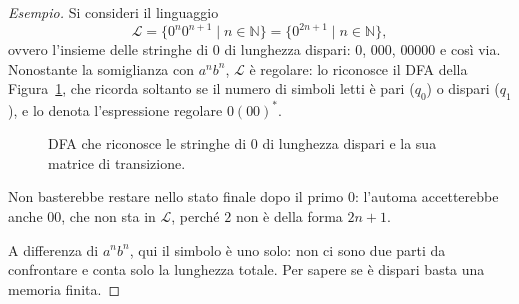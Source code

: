 \documentclass[a4paper, 11pt, oneside]{book}
\theoremstyle{formale}
\newenvironment{esempio}
    {\begin{proof}[\textit{Esempio}]\renewcommand{\qedsymbol}{$\diamond$}}
    {\end{proof}}
\begin{document}
    \begin{esempio}
        Si consideri il linguaggio
        \begin{equation*}
            \mathcal{L} = \{0^n 0^{n+1} \mid n \in \mathbb{N}\}
            = \{0^{2n+1} \mid n \in \mathbb{N}\},
        \end{equation*}
        ovvero l'insieme delle stringhe di $0$ di lunghezza dispari: $0$, $000$, $00000$ e
        cos\`i via. Nonostante la somiglianza con $a^n b^n$, $\mathcal{L}$ \`e regolare:
        lo riconosce il DFA della Figura~\ref{fig:dfa-dispari}, che ricorda soltanto se il
        numero di simboli letti \`e pari ($q_0$) o dispari ($q_1$), e lo denota
        l'espressione regolare $0(00)^*$.

        \begin{figure}[H]
            \centering
            \caption{DFA che riconosce le stringhe di $0$ di lunghezza dispari e la sua
                matrice di transizione.}
            \label{fig:dfa-dispari}
        \end{figure}

        Non basterebbe restare nello stato finale dopo il primo $0$: l'automa accetterebbe
        anche $00$, che non sta in $\mathcal{L}$, perch\'e $2$ non \`e della forma
        $2n + 1$.

        A differenza di $a^n b^n$, qui il simbolo \`e uno solo: non ci sono due parti da
        confrontare e conta solo la lunghezza totale. Per sapere se \`e dispari basta una
        memoria finita.
    \end{esempio}
\end{document}
